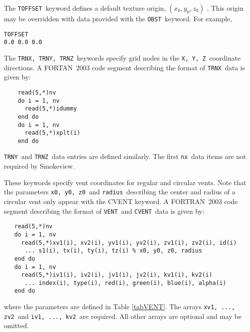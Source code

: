 \documentclass[11pt,twoside]{book}
\newcommand{\hitem}[1]{\item[{\bf #1} \hfill]}
\begin{document}
\hitem{TOFFSET}The {\tt TOFFSET}\ keyword defines a default texture origin, $(x_0, y_0, z_0)$ .
This origin may be overridden with data provided with the {\tt OBST}\ keyword. For example,

\begin{lstlisting}
TOFFSET
0.0 0.0 0.0
\end{lstlisting}

\hitem{TRNX,TRNY,TRNZ}The {\tt TRNX, TRNY, TRNZ}\ keywords specify
grid nodes in the {\tt X, Y, Z}\ coordinate directions.  A
FORTAN~2003 code segment describing the format of {\tt TRNX}\ data
is given by:
\begin{lstlisting}
    read(5,*)nv
    do i = 1, nv
      read(5,*)idummy
    end do
    do i = 1, nv
      read(5,*)xplt(i)
    end do
\end{lstlisting}
{\tt TRNY}\ and {\tt TRNZ}\ data entries are defined similarly. The
first {\tt nx}\ data items are not required by Smokeview.

\hitem{VENT, CVENT}These keywords specify vent coordinates for regular and circular vents.
Note that the parameters {\tt x0, y0, z0}\ and {\tt radius}\ describing the center and radius
of a circular vent
only appear with the CVENT keyword.
A FORTRAN~2003
code segment describing the format of {\tt VENT}\ and {\tt CVENT}\ data is given by:
\begin{lstlisting}
   read(5,*)nv
   do i = 1, nv
     read(5,*)xv1(i), xv2(i), yv1(i), yv2(i), zv1(i), zv2(i), id(i)
      ... s1(i), tx(i), ty(i), tz(i) % x0, y0, z0, radius
   end do
   do i = 1, nv
     read(5,*)iv1(i), iv2(i), jv1(i), jv2(i), kv1(i), kv2(i)
      ... index(i), type(i), red(i), green(i), blue(i), alpha(i)
   end do
\end{lstlisting}
where the parameters are defined in Table \ref{tabVENT}.
The arrays {\tt xv1,  ..., zv2}\ and {\tt iv1, ..., kv2}\ are
required. All other arrays are optional and may be omitted.
\end{document}

